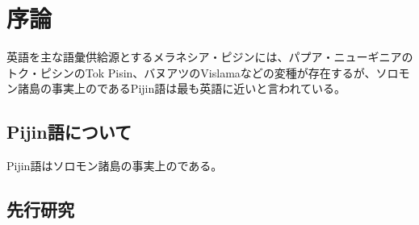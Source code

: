 \chapter{序論}

%

英語を主な語彙供給源とするメラネシア・ピジンには、パプア・ニューギニアのトク・ピシンのTok Pisin、バヌアツのVislamaなどの変種が存在するが、ソロモン諸島の事実上のであるPijin語は最も英語に近いと言われている。

\section{Pijin語について}

Pijin語はソロモン諸島の事実上のである。

\section{先行研究}

